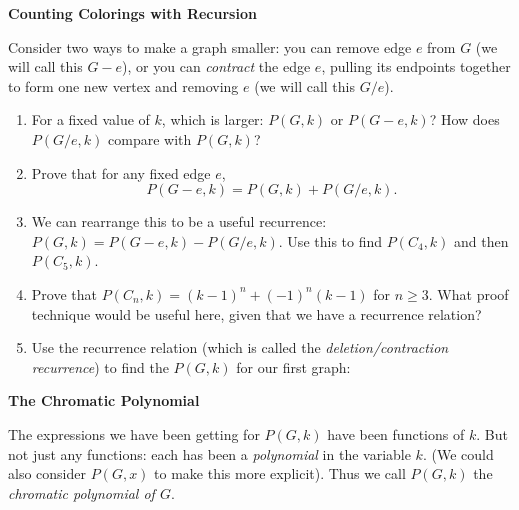 \documentclass[12pt]{article}
\begin{document}
\newpage


\begin{center}
  \textbf{Counting Colorings with Recursion}
\end{center}
Consider two ways to make a graph smaller: you can remove edge $e$ from $G$ (we will call this $G - e$), or you can \emph{contract} the edge $e$, pulling its endpoints together to form one new vertex and removing $e$ (we will call this $G/e$).

\begin{enumerate}
  \item For a fixed value of $k$, which is larger: $P(G,k)$ or $P(G-e,k)$?  How does $P(G/e,k)$ compare with $P(G,k)$?
  \vfill

  \item Prove that for any fixed edge $e$,
  \[P(G-e,k) = P(G,k) + P(G/e,k).\]
  \vfill

  \item We can rearrange this to be a useful recurrence: $P(G,k) = P(G-e,k) - P(G/e,k)$.  Use this to find $P(C_4,k)$ and then $P(C_5,k)$.
  \vfill
  \newpage
  \item Prove that $P(C_n, k) = (k-1)^n + (-1)^n(k-1)$ for $n \ge 3$.  What proof technique would be useful here, given that we have a recurrence relation?
  \vfill
  \item Use the recurrence relation (which is called the \emph{deletion/contraction recurrence}) to find the $P(G, k)$ for our first graph:
  \begin{center}
    {\footnotesize
    }
  \end{center}
  \vfill
\end{enumerate}

\newpage

\begin{center}
  \textbf{The Chromatic Polynomial}
\end{center}

The expressions we have been getting for $P(G,k)$ have been functions of $k$.  But not just any functions: each has been a \emph{polynomial} in the variable $k$.  (We could also consider $P(G,x)$ to make this more explicit).  Thus we call $P(G,k)$ the \emph{chromatic polynomial of $G$}.
\end{document}
